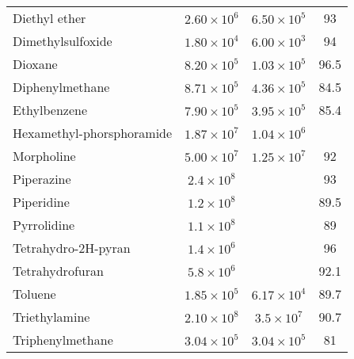 \begin{longtable}{m{3.1cm} | c c c}
 Diethyl ether                  & $ 2.60 \times 10^6$ & $6.50 \times 10^5 $ &        93 \\
 Dimethylsulfoxide              & $ 1.80 \times 10^4$ & $6.00 \times 10^3 $ &        94 \\
 Dioxane                        & $ 8.20 \times 10^5$ & $1.03 \times 10^5 $ &      96.5 \\
 Diphenylmethane                & $ 8.71 \times 10^5$ & $4.36 \times 10^5 $ &      84.5 \\
 Ethylbenzene                   & $ 7.90 \times 10^5$ & $3.95 \times 10^5 $ &      85.4 \\
 Hexamethyl-phorsphoramide       & $ 1.87 \times 10^7$ & $1.04 \times 10^6 $ &           \\
 Morpholine                     & $ 5.00 \times 10^7$ & $1.25 \times 10^7 $ &        92 \\
 Piperazine                     & $ 2.4 \times 10^8 $ &                &        93 \\
 Piperidine                     & $ 1.2 \times 10^8 $ &                &      89.5 \\
 Pyrrolidine                    & $ 1.1 \times 10^8 $ &                &        89 \\
 Tetrahydro-2H-pyran            & $ 1.4 \times 10^6 $ &                &        96 \\
 Tetrahydrofuran                & $ 5.8 \times 10^6 $ &                &      92.1 \\
 Toluene                        & $ 1.85 \times 10^5$ & $6.17 \times 10^4 $ &      89.7 \\
 Triethylamine                  & $ 2.10 \times 10^8$ & $3.5 \times 10^7  $ &      90.7 \\
 Triphenylmethane               & $ 3.04 \times 10^5$ & $3.04 \times 10^5 $ &        81 \\
\end{longtable}
